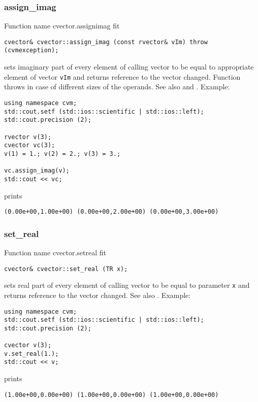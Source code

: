 \subsubsection{assign\_imag}
Function%
\pdfdest name {cvector.assignimag} fit
\begin{verbatim}
cvector& cvector::assign_imag (const rvector& vIm) throw (cvmexception);
\end{verbatim}
sets imaginary part of every element of  calling vector to be equal to
appropriate element of  vector \verb"vIm"
and returns  reference to
the vector changed.
Function throws  
in case of different sizes of the operands.
See also  and .
Example:
\begin{Verbatim}
using namespace cvm;
std::cout.setf (std::ios::scientific | std::ios::left);
std::cout.precision (2);

rvector v(3);
cvector vc(3);
v(1) = 1.; v(2) = 2.; v(3) = 3.;

vc.assign_imag(v);
std::cout << vc;
\end{Verbatim}
prints
\begin{Verbatim}
(0.00e+00,1.00e+00) (0.00e+00,2.00e+00) (0.00e+00,3.00e+00)
\end{Verbatim}
\newpage


\subsubsection{set\_real}
Function%
\pdfdest name {cvector.setreal} fit
\begin{verbatim}
cvector& cvector::set_real (TR x);
\end{verbatim}
sets real part of every element of  calling vector to be equal to
parameter \verb"x"
and returns  reference to the vector changed.
See also .
Example:
\begin{Verbatim}
using namespace cvm;
std::cout.setf (std::ios::scientific | std::ios::left);
std::cout.precision (2);

cvector v(3);
v.set_real(1.);
std::cout << v;
\end{Verbatim}
prints
\begin{Verbatim}
(1.00e+00,0.00e+00) (1.00e+00,0.00e+00) (1.00e+00,0.00e+00)
\end{Verbatim}
\newpage



